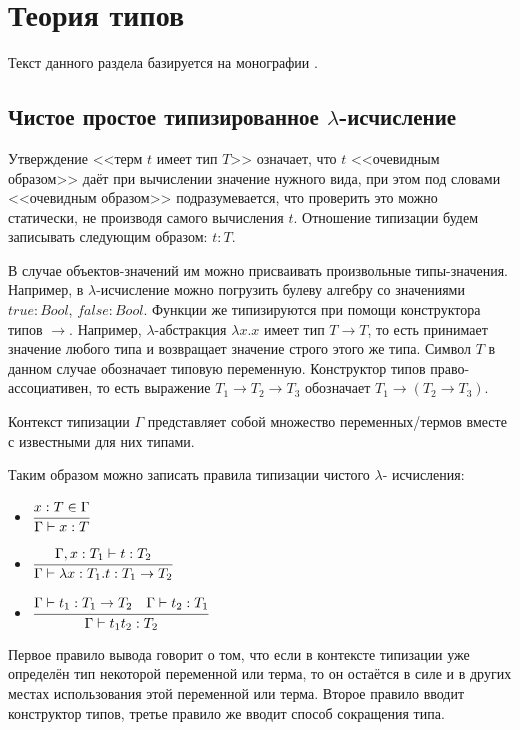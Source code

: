 \chapter{Теория типов}

Текст данного раздела базируется на монографии \cite{Pierce}.

\section{Чистое простое типизированное $\lambda$-исчисление}

Утверждение <<терм $t$ имеет тип $T$>> означает, что $t$ <<очевидным образом>> даёт при вычислении значение нужного вида, при этом под словами <<очевидным образом>> подразумевается, что проверить это можно статически, не производя самого вычисления $t$. Отношение типизации будем записывать следующим образом: $t: T$.

В случае объектов-значений им можно присваивать произвольные типы-значения. Например, в $\lambda$-исчисление можно погрузить булеву алгебру со значениями $true: Bool$, $false: Bool$. Функции же типизируются при помощи конструктора типов $\to$. Например, $\lambda$-абстракция $\lambda x.x$ имеет тип $T \to T$, то есть принимает значение любого типа и возвращает значение строго этого же типа. Символ $T$ в данном случае обозначает типовую переменную. Конструктор типов право-ассоциативен, то есть выражение $T_1 \to T_2 \to T_3$ обозначает $T_1 \to (T_2 \to T_3)$.

\begin{definition}
    Контекст типизации $\Gamma$ представляет собой множество переменных/термов вместе с известными для них типами.
\end{definition}

Таким образом можно записать правила типизации чистого $\lambda$- исчисления:

\begin{itemize}
    \item $\cfrac{x:T \in \Gamma}{\Gamma \vdash x:T}$
    \item $\cfrac{\Gamma,x: T_1\vdash t: T_2}{\Gamma \vdash \lambda x:T_1.t: T_1 \to T_2}$
    \item $\cfrac{\Gamma \vdash t_1: T_1 \to T_2 \ \ \ \Gamma \vdash t_2 : T_1}{\Gamma \vdash t_1t_2:T_2}$
\end{itemize}

Первое правило вывода говорит о том, что если в контексте типизации уже определён тип некоторой переменной или терма, то он остаётся в силе и в других местах использования этой переменной или терма. Второе правило вводит конструктор типов, третье правило же вводит способ сокращения типа.


